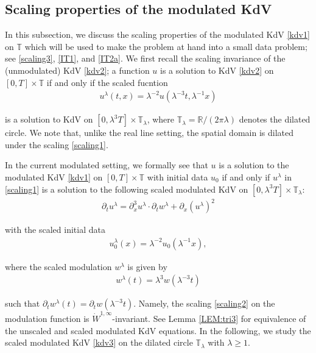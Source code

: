 \documentclass[letterpaper, 11pt,  reqno]{amsart}
\newcommand{\1}{\hspace{0.5mm}\text{I}\hspace{0.5mm}}
\newcommand{\noi}{\noindent}
\newcommand{\R}{\mathbb{R}}
\newcommand{\T}{\mathbb{T}}
\newcommand{\ld}{\lambda}
\newcommand{\dx}{\partial_x}
\newcommand{\dt}{\partial_t}
\numberwithin{equation}{section}
\numberwithin{theorem}{section}
\begin{document}
\subsection{Scaling properties of the modulated KdV}
\label{SUBSEC:I1}


In this subsection, we discuss
the scaling properties
of the modulated KdV \eqref{kdv1}
on $\T$
which will be used to make the problem at hand
into a small data problem; see \eqref{scaling3},  \eqref{IT1}, and \eqref{IT2a}.
We first recall the scaling invariance
of the (unmodulated) KdV \eqref{kdv2};
a function  $u$ is a solution to KdV \eqref{kdv2} on  $[0, T]\times \T$
 if and only if  
  the scaled fucntion 
\begin{align}
 u^{\ld}(t,x)=\ld^{-2}u(\ld^{-3}t,\ld^{-1}x)
 \label{scaling1}
\end{align}
 
 \noi
  is  a solution to   KdV  on $[0,\ld^3T]\times \T_\ld$,
where
  $\T_\ld = \R/(2\pi \ld)$
denotes the dilated circle.
We note that, unlike the real line setting, 
the spatial domain is dilated under the scaling \eqref{scaling1}.

In the current modulated setting, 
we formally see that 
  $u$ is a solution to  the modulated KdV \eqref{kdv1} on $[0, T] \times \T$ with initial data $u_0$
  if and only if 
$u^\ld$ in \eqref{scaling1}
is a solution to the 
following scaled modulated KdV  on $[0, \ld^3 T] \times \T_\ld$:
\begin{align}
\dt u^{\ld} =    \dx^3 u^{\ld}\cdot \dt w^{\ld}  +\partial_x(u^{\ld} )^2
\label{kdv3}
\end{align}




\noi
with the scaled initial data
\begin{align}
u_0^\ld(x) = \ld^{-2} u_0(\ld^{-1}x), 
\label{scaling1a}
\end{align}

\noi
where the scaled modulation $w^\ld$ is given by
\begin{align}
w^{\ld}(t)= \ld^3w(\ld^{-3}t)
\label{scaling2} 
\end{align}

\noi
such that $\dt w^\ld(t) = \dt w(\ld^{-3} t)$.
Namely, the scaling \eqref{scaling2} on the modulation function
is $\dot W^{1, \infty}$-invariant.
See Lemma \ref{LEM:tri3}
for  equivalence of the unscaled and scaled modulated KdV equations.
In the following, we study the scaled modulated KdV \eqref{kdv3} on 
the dilated circle $\T_\ld$ with $\ld \ge 1$.
\end{document}
